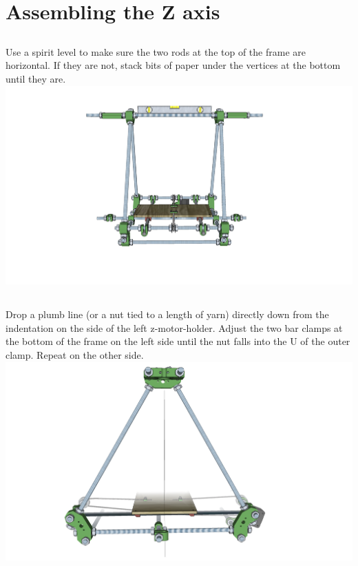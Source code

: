 \documentclass[twoside,openany,a4paper,titlepage]{memoir}
\begin{document}
	\chapter{Assembling the Z axis}
	
	\section{}
	Use a spirit level to make sure the two rods at the top of the frame are horizontal. If they are not, stack
	bits of paper under the vertices at the bottom until they are.\\
	\includegraphics[width=1\linewidth]{graphics/ch8_1.png}

	\section{}
	Drop a plumb line (or a nut tied to a length of yarn) directly down from the indentation on the side of the
	left z-motor-holder. Adjust the two bar clamps at the bottom of the frame on the left side until the nut
	falls into the U of the outer clamp. Repeat on the other side.\\
	\includegraphics[width=1\linewidth]{graphics/ch8_2.png}
	
\end{document}
